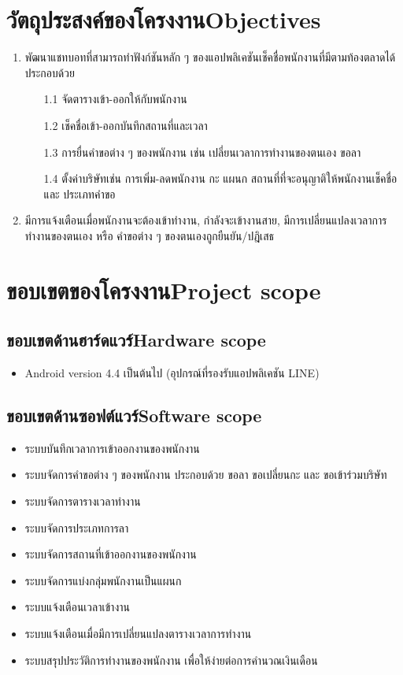 \section{\ifcpe วัตถุประสงค์ของโครงงาน\else Objectives\fi}
\begin{enumerate}
    \item พัฒนาแชทบอทที่สามารถทำฟังก์ชันหลัก ๆ ของแอปพลิเคชันเช็คชื่อพนักงานที่มีตามท้องตลาดได้ ประกอบด้วย 
    \begin{enumerate}
    \item[1.1] จัดตารางเข้า-ออกให้กับพนักงาน
    \item[1.2] เช็คชื่อเข้า-ออกบันทึกสถานที่และเวลา
    \item[1.3] การยื่นคำขอต่าง ๆ ของพนักงาน เช่น เปลี่ยนเวลาการทำงานของตนเอง ขอลา
    \item[1.4] ตั้งค่าบริษัทเช่น การเพิ่ม-ลดพนักงาน กะ แผนก สถานที่ที่จะอนุญาติให้พนักงานเช็คชื่อ และ ประเภทคำขอ
    \end{enumerate} 
    \item มีการแจ้งเตือนเมื่อพนักงานจะต้องเข้าทำงาน, กำลังจะเข้างานสาย, มีการเปลี่ยนแปลงเวลาการทำงานของตนเอง หรือ คำขอต่าง ๆ ของตนเองถูกยืนยัน/ปฎิเสธ
\end{enumerate}

\section{\ifcpe ขอบเขตของโครงงาน\else Project scope\fi}

\subsection{\ifcpe ขอบเขตด้านฮาร์ดแวร์\else Hardware scope\fi}
\begin{itemize}
    \item Android version 4.4 เป็นต้นไป (อุปกรณ์ที่รองรับแอปพลิเคชัน LINE)
\end{itemize}

\subsection{\ifcpe ขอบเขตด้านซอฟต์แวร์\else Software scope\fi}
\begin{itemize}
    \item ระบบบันทึกเวลาการเข้าออกงานของพนักงาน
    \item ระบบจัดการคำขอต่าง ๆ ของพนักงาน ประกอบด้วย ขอลา ขอเปลี่ยนกะ และ ขอเข้าร่วมบริษัท
    \item ระบบจัดการตารางเวลาทำงาน 
    \item ระบบจัดการประเภทการลา
    \item ระบบจัดการสถานที่เข้าออกงานของพนักงาน
    \item ระบบจัดการแบ่งกลุ่มพนักงานเป็นแผนก
    \item ระบบแจ้งเตือนเวลาเข้างาน
    \item ระบบแจ้งเตือนเมื่อมีการเปลี่ยนแปลงตารางเวลาการทำงาน
    \item ระบบสรุปประวัติการทำงานของพนักงาน เพื่อให้ง่ายต่อการคำนวณเงินเดือน
\end{itemize}

